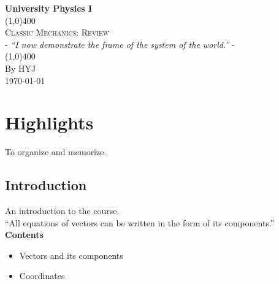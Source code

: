\documentclass[11pt, a4paper, oneside]{book}
\numberwithin{equation}{section}%
\begin{document}
	
	\begin{titlepage}
		\begin{center}
			\Large{\textbf{University Physics I}}\\
			\vfill%
			\line(1,0){400}\\[1mm]
			\huge{\textsc{Classic Mechanics: Review}}\\[3mm]
			\Large{- \textit{``I now demonstrate the frame of the system of the world.''} -}\\[1mm]
			\line(1,0){400}\\
			\vfill
			By HYJ \\
			\today
		\end{center}
	\end{titlepage}

\tableofcontents
\thispagestyle{empty}






\chapter{Highlights}

To organize and memorize.
\section{Introduction}

An introduction to the course.\\ 
``All equations of vectors can be written in the form of its components.''\\

\textbf{Contents}
\begin{itemize}
	\item Vectors and its components
	\item Coordinates
\end{itemize}
\end{document}
